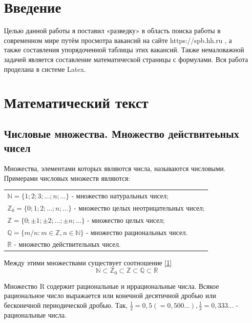 
\section*{Введение}
Целью данной работы я поставил «разведку» в область поиска работы в современном мире путём просмотра вакансий на сайте https://spb.hh.ru \cite{hh}, а также составления упорядоченной таблицы этих вакансий. Также немаловажной задачей является составление математической страницы с формулами. Вся работа проделана в системе Latex.


\newpage
\section{Математический текст} \cite{conspect}

\subsection{Числовые множества. Множество действитеьных чисел}

Множества, элементами которых являются числа, называются числовыми. Примерами числовых множеств являются:
\begin{center}
\begin{tabular}{l}
 ${\mathbb {N}}=\{1;2;3;\ldots;{n};\ldots\}$ - множество натуральных чисел; \\ 
 ${\mathbb {Z}_0}=\{0;1;2;\ldots;{n};\ldots\}$ - множество целых неотрицательных чисел; \\  
 ${\mathbb {Z}}=\{0; \pm 1; \pm 2;\ldots;\pm {n};\ldots\}$ - множество целых чисел; \\
 ${\mathbb {Q}}=\{m/n:m \in \mathbb {Z},n \in \mathbb {N}\}$ - множество рациональных чисел. \\
 ${\mathbb {R}}$ - множество действительных чисел. \\
\end{tabular}
\end{center}

Между этими множествами существует соотношение \eqref{1}
\begin{equation}
\mathbb {N} \subset \mathbb {Z}_0 \subset \mathbb {Z} \subset \mathbb {Q} \subset \mathbb {R} \label{1}
\end{equation}

Множество R содержит рациональные и иррациональные числа. Всякое рациональное число выражается или конечной десятичной дробью или бесконечной периодической дробью. Так, $\frac{1}{2}=0,5 (=0,500\ldots), \frac{1}{3}=0,333\ldots$ - рациональные числа.

